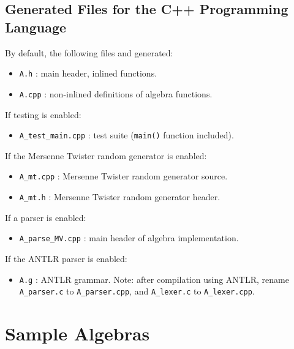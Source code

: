 \documentclass[10pt, a4paper]{article}
\begin{document}
\subsection{Generated Files for the C++ Programming Language}

By default, the following files and generated:
\begin{itemize}
\item {\tt A.h} : main header, inlined functions.
\item {\tt A.cpp} : non-inlined definitions of algebra functions.
\end{itemize}
If testing is enabled:
\begin{itemize}
\item {\tt A\_test\_main.cpp} : test suite ({\tt main()} function included).
\end{itemize}
If the Mersenne Twister random generator is enabled:
\begin{itemize}
\item {\tt A\_mt.cpp} : Mersenne Twister random generator source.
\item {\tt A\_mt.h} : Mersenne Twister random generator header.
\end{itemize}
If a parser is enabled:
\begin{itemize}
\item {\tt A\_parse\_MV.cpp} : main header of algebra implementation.
\end{itemize}
If the ANTLR parser is enabled:
\begin{itemize}
\item {\tt A.g} : ANTLR grammar. Note: after compilation using ANTLR, rename
{\tt A\_parser.c} to {\tt A\_parser.cpp}, and {\tt A\_lexer.c} to {\tt A\_lexer.cpp}.
\end{itemize}





\section{Sample Algebras}
\label{s:sample_algebras}
\end{document}
